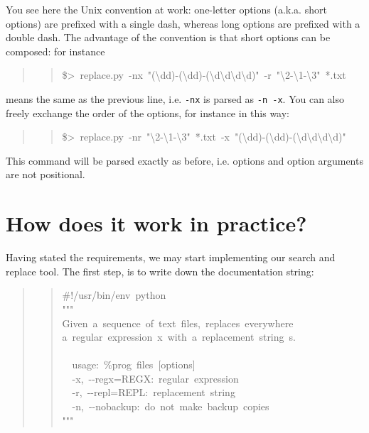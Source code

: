 \documentclass[10pt,a4paper,english]{article}
\begin{document}
You see here the Unix convention at work: one-letter options
(a.k.a. short options) are prefixed with a single dash, whereas 
long options are prefixed with a double dash. The advantage of the 
convention is that short options can be composed: for instance
\begin{quote}
\begin{quote}{\ttfamily \raggedright \noindent
{\$}>~replace.py~-nx~"({\textbackslash}dd)-({\textbackslash}dd)-({\textbackslash}d{\textbackslash}d{\textbackslash}d{\textbackslash}d)"~-r~"{\textbackslash}2-{\textbackslash}1-{\textbackslash}3"~*.txt
}\end{quote}
\end{quote}

means the same as the previous line, i.e. \texttt{-nx} is parsed as
\texttt{-n -x}.  You can also freely exchange the order of the options,
for instance in this way:
\begin{quote}
\begin{quote}{\ttfamily \raggedright \noindent
{\$}>~replace.py~-nr~"{\textbackslash}2-{\textbackslash}1-{\textbackslash}3"~*.txt~-x~"({\textbackslash}dd)-({\textbackslash}dd)-({\textbackslash}d{\textbackslash}d{\textbackslash}d{\textbackslash}d)"
}\end{quote}
\end{quote}

This command will be parsed exactly as before, i.e. options and option 
arguments are not positional.



\hypertarget{how-does-it-work-in-practice}{}
\section*{How does it work in practice?}

Having stated the requirements, we may start implementing our 
search and replace tool. The first step, is to write down the 
documentation string:
\begin{quote}
\begin{quote}{\ttfamily \raggedright \noindent
{\#}!/usr/bin/env~python~\\
"{}"{}"~\\
Given~a~sequence~of~text~files,~replaces~everywhere~\\
a~regular~expression~x~with~a~replacement~string~s.~\\
~\\
~~usage:~{\%}prog~files~{[}options]~\\
~~-x,~-{}-regx=REGX:~regular~expression~\\
~~-r,~-{}-repl=REPL:~replacement~string~\\
~~-n,~-{}-nobackup:~do~not~make~backup~copies~\\
"{}"{}"
}\end{quote}
\end{quote}
\end{document}
